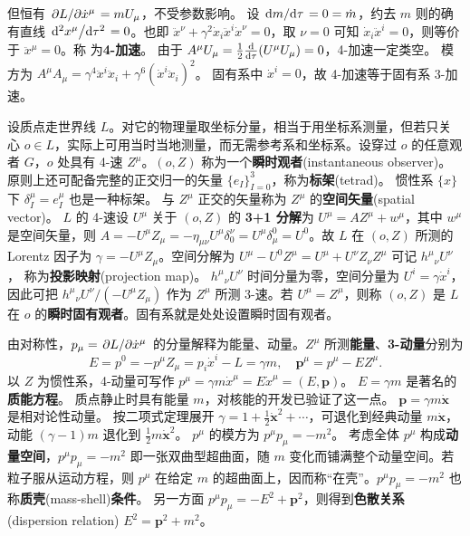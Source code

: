 但恒有 $\pdv*{L}{\dot x^\mu} = m U_\mu$，不受参数影响。
设 $\dv*{m}{\tau}=0=\dot m$，约去 $m$ 则的确有直线 $\dv*[2]{x^\mu}{\tau}=0$。也即 $\ddot x^\nu + \gamma^2\dot{x}_i\ddot{x}^i\dot x^\nu=0$，取 $\nu=0$ 可知 $\dot{x}_i\ddot{x}^i=0$，则等价于 $\ddot x^\mu=0$。称
为\textbf{4-加速}。
由于 $A^\mu U_\mu=\frac 12 \dv{\tau}(U^\mu U_\mu)=0$，4-加速一定类空。
模方为 $A^\mu A_\mu=\gamma^4 \ddot{x}^i\ddot{x}_i+\gamma^6(\dot{x}^i \ddot{x}_i)^2$。
固有系中 $\dot{x}^i=0$，故 4-加速等于固有系 3-加速。

设质点走世界线 $L$。对它的物理量取坐标分量，相当于用坐标系测量，但若只关心 $o\in L$，实际上可用当时当地测量，而无需参考系和坐标系。设穿过 $o$ 的任意观者 $G$，$o$ 处具有 4-速 $Z^\mu$。$(o,Z)$ 称为一个\textbf{瞬时观者}(instantaneous observer)。原则上还可配备完整的正交归一的矢量 $\{e_I\}_{I=0}^3$，称为\textbf{标架}(tetrad)。
惯性系 $\{x\}$ 下 $\delta^\mu_I = e_I^\mu$ 也是一种标架。
与 $Z^\mu$ 正交的矢量称为 $Z^\mu$ 的\textbf{空间矢量}(spatial vector)。
$L$ 的 4-速设 $U^\mu$ 关于 $(o,Z)$ 的 \textbf{3+1 分解}为 $U^\mu = A Z^\mu + w^\mu$，其中 $w^\mu$ 是空间矢量，则 $A=-U^\mu Z_\mu = -\eta_{\mu\nu}U^\mu\delta^\nu_0 = U^\mu\delta^0_\mu = U^0$。故 $L$ 在 $(o,Z)$ 所测的 Lorentz 因子为 $\gamma=-U^\mu Z_\mu$。空间分解为 $U^\mu - U^0 Z^\mu = U^\mu + U^\nu Z_\nu Z^\mu$ 可记 $h^\mu{}_\nu U^\nu$，
称为\textbf{投影映射}(projection map)。
$h^\mu{}_\nu U^\nu$ 时间分量为零，空间分量为 $U^i=\gamma\dot x^i$，因此可把 $h^\mu{}_\nu U^\nu/(-U^\mu Z_\mu)$ 作为 $Z^\mu$ 所测 3-速。若 $U^\mu=Z^\mu$，则称 $(o,Z)$ 是 $L$ 在 $o$ 的\textbf{瞬时固有观者}。固有系就是处处设置瞬时固有观者。

由对称性，$p_\mu=\pdv*{L}{\dot x^\mu}$ 的分量解释为能量、动量。$Z^\mu$ 所测\textbf{能量}、\textbf{3-动量}分别为
\[E=p^0=-p^\mu Z_\mu=p_i \dot{x}^i-L=\gamma m,\quad \bm p^\mu = p^\mu - E Z^\mu.\]
以 $Z$ 为惯性系，4-动量可写作 $p^\mu=\gamma m \dot x^\mu=E\dot x^\mu=(E,\bm p)$。
$E=\gamma m$ 是著名的\textbf{质能方程}。
质点静止时具有能量 $m$，对核能的开发已验证了这一点。
$\bm p=\gamma m \dot{\bm x}$ 是相对论性动量。
按二项式定理展开 $\gamma=1+\frac{1}{2} \dot{\bm x}^{2}+\cdots$，可退化到经典动量 $m \dot{\bm x}$，动能 $(\gamma-1)m$ 退化到 $\frac12 m\dot{\bm x}^{2}$。
$p^\mu$ 的模方为 $p^\mu p_\mu=-m^2$。
考虑全体 $p^\mu$ 构成\textbf{动量空间}，$p^\mu p_\mu = -m^2$ 即一张双曲型超曲面，随 $m$ 变化而铺满整个动量空间。若粒子服从运动方程，则 $p^\mu$ 在给定 $m$ 的超曲面上，因而称“在壳”。$p^\mu p_\mu=-m^2$ 也称\textbf{质壳}(mass-shell)\textbf{条件}。
另一方面 $p^\mu p_\mu=-E^2+\bm p^2$，则得到\textbf{色散关系}(dispersion relation) $E^2= \bm p^2+m^2$。


